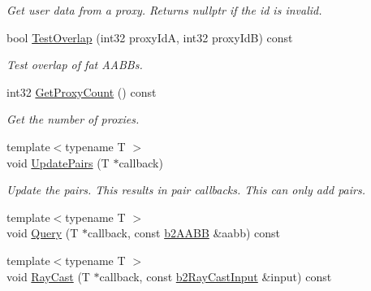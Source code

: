 \begin{DoxyCompactItemize}
\begin{DoxyCompactList}\small\item\em Get user data from a proxy. Returns nullptr if the id is invalid. \end{DoxyCompactList}\item 
\mbox{\label{classb2_broad_phase_a263cc21e2a3f1f892c20b048eca3cad6}} 
bool \hyperlink{classb2_broad_phase_a263cc21e2a3f1f892c20b048eca3cad6}{Test\+Overlap} (int32 proxy\+IdA, int32 proxy\+IdB) const
\begin{DoxyCompactList}\small\item\em Test overlap of fat A\+A\+B\+Bs. \end{DoxyCompactList}\item 
\mbox{\label{classb2_broad_phase_ab7a8c31223d8404b79f6c57e8fc69837}} 
int32 \hyperlink{classb2_broad_phase_ab7a8c31223d8404b79f6c57e8fc69837}{Get\+Proxy\+Count} () const
\begin{DoxyCompactList}\small\item\em Get the number of proxies. \end{DoxyCompactList}\item 
\mbox{\label{classb2_broad_phase_a0a1acd693466b997700242ae00784c20}} 
{\footnotesize template$<$typename T $>$ }\\void \hyperlink{classb2_broad_phase_a0a1acd693466b997700242ae00784c20}{Update\+Pairs} (T $\ast$callback)
\begin{DoxyCompactList}\small\item\em Update the pairs. This results in pair callbacks. This can only add pairs. \end{DoxyCompactList}\item 
{\footnotesize template$<$typename T $>$ }\\void \hyperlink{classb2_broad_phase_a187586ea98b9d16e5ef6e12fa31f8de2}{Query} (T $\ast$callback, const \hyperlink{structb2_a_a_b_b}{b2\+A\+A\+BB} \&aabb) const
\item 
{\footnotesize template$<$typename T $>$ }\\void \hyperlink{classb2_broad_phase_ae65392ea91c7d0839ed5312f78b2837a}{Ray\+Cast} (T $\ast$callback, const \hyperlink{structb2_ray_cast_input}{b2\+Ray\+Cast\+Input} \&input) const
\item 
\mbox{\label{classb2_broad_phase_a868f95225d62c3ea79d231ed305253ea}} 

\end{DoxyCompactItemize}
